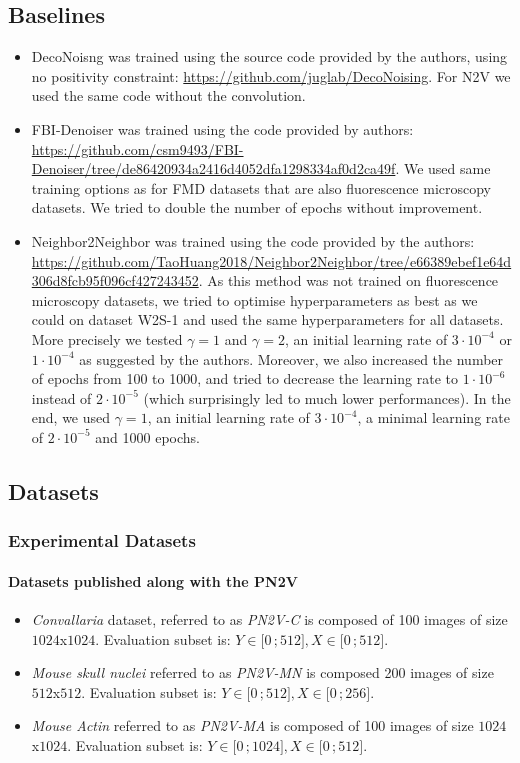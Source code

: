 \documentclass[lettersize,journal]{IEEEtran}
\newcommand{\interval}[2]{\mathopen{[}#1\,;#2\mathclose{]}}
\begin{document}
\subsection{Baselines}
\label{si:baselines}
\begin{itemize}
  \item DecoNoisng was trained using the source code provided by the authors, using no positivity constraint: \url{https://github.com/juglab/DecoNoising}. For N2V we used the same code without the convolution.
  \item FBI-Denoiser was trained using the code provided by authors: \url{https://github.com/csm9493/FBI-Denoiser/tree/de86420934a2416d4052dfa1298334af0d2ca49f}. We used same training options as for FMD datasets that are also fluorescence microscopy datasets. We tried to double the number of epochs without improvement.
  \item Neighbor2Neighbor was trained using the code provided by the authors: \url{https://github.com/TaoHuang2018/Neighbor2Neighbor/tree/e66389ebef1e64d306d8fcb95f096cf427243452}. As this method was not trained on fluorescence microscopy datasets, we tried to optimise hyperparameters as best as we could on dataset W2S-1 and used the same hyperparameters for all datasets. More precisely we tested $\gamma=1$ and $\gamma=2$, an initial learning rate of $3\cdot10^{-4}$ or $1\cdot10^{-4}$ as suggested by the authors. Moreover, we also increased the number of epochs from 100 to 1000, and tried to decrease the learning rate to $1\cdot10^{-6}$ instead of $2\cdot10^{-5}$ (which surprisingly led to much lower performances). In the end, we used $\gamma=1$, an initial learning rate of $3\cdot10^{-4}$, a minimal learning rate of $2\cdot10^{-5}$ and 1000 epochs.
\end{itemize}

\subsection{Datasets}
\subsubsection{Experimental Datasets}
\label{si:datasetxp}
\paragraph{Datasets published along with the PN2V \cite{krull2019probabilistic}}
\begin{itemize}
  \item \emph{Convallaria} dataset, referred to as \emph{PN2V-C} is composed of 100 images of size $1024$x$1024$. Evaluation subset is: $Y\in\interval{0}{512}, X\in\interval{0}{512}$.
  \item \emph{Mouse skull nuclei} referred to as \emph{PN2V-MN} is composed 200 images of size $512$x$512$. Evaluation subset is: $Y\in\interval{0}{512}, X\in\interval{0}{256}$.
  \item \emph{Mouse Actin} referred to as \emph{PN2V-MA} is composed of 100 images of size $1024$x$1024$. Evaluation subset is: $Y\in\interval{0}{1024}, X\in\interval{0}{512}$.
\end{itemize}
\end{document}
